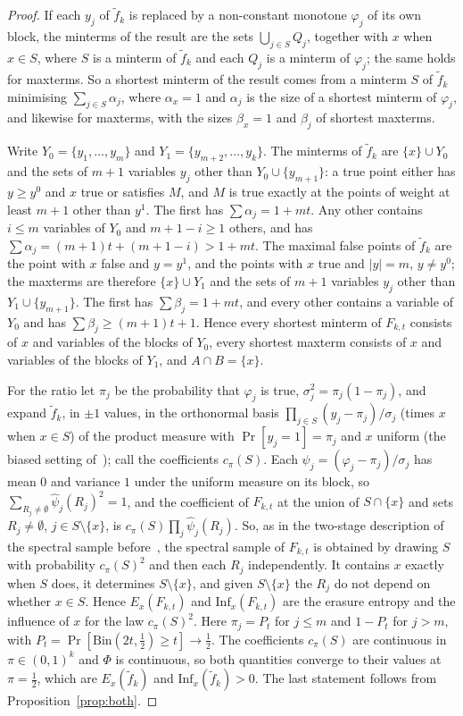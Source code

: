 \documentclass[11pt]{amsart}
\theoremstyle{remark}
\newcommand{\Inf}{\mathrm{Inf}}
\begin{document}
\begin{proof}
If each $y_j$ of $\tilde f_k$ is replaced by a non-constant monotone $\varphi_j$ of its own block, the minterms of
the result are the sets $\bigcup_{j\in S}Q_j$, together with $x$ when $x\in S$, where $S$ is a minterm of $\tilde f_k$ and each $Q_j$ is a minterm of $\varphi_j$; the same holds for maxterms. So a shortest minterm of the result comes from a
minterm $S$ of $\tilde f_k$ minimising $\sum_{j\in S}\alpha_j$, where $\alpha_x=1$ and $\alpha_j$ is the size of a shortest minterm of $\varphi_j$, and likewise for maxterms, with the sizes $\beta_x=1$ and $\beta_j$ of shortest maxterms.

Write $Y_0=\{y_1,\dots,y_m\}$ and $Y_1=\{y_{m+2},\dots,y_k\}$. The minterms of $\tilde f_k$ are $\{x\}\cup Y_0$ and the
sets of $m+1$ variables $y_j$ other than $Y_0\cup\{y_{m+1}\}$: a true point either has $y\ge y^0$ and $x$ true or
satisfies $M$, and $M$ is true exactly at the points of weight at least $m+1$ other than $y^1$. The first has
$\sum\alpha_j=1+mt$. Any other contains $i\le m$ variables of $Y_0$ and $m+1-i\ge1$ others, and has
$\sum\alpha_j=(m+1)t+(m+1-i)>1+mt$. The maximal false points of $\tilde f_k$ are the point with $x$ false and $y=y^1$, and
the points with $x$ true and $|y|=m$, $y\ne y^0$; the maxterms are therefore $\{x\}\cup Y_1$ and the sets of $m+1$
variables $y_j$ other than $Y_1\cup\{y_{m+1}\}$. The first has $\sum\beta_j=1+mt$, and every other contains a variable of
$Y_0$ and has $\sum\beta_j\ge(m+1)t+1$. Hence every shortest minterm of $F_{k,t}$ consists of $x$ and variables of the
blocks of $Y_0$, every shortest maxterm consists of $x$ and variables of the blocks of $Y_1$, and $A\cap B=\{x\}$.

For the ratio let $\pi_j$ be the probability that $\varphi_j$ is true, $\sigma_j^2=\pi_j(1-\pi_j)$, and expand
$\tilde f_k$, in $\pm1$ values, in the orthonormal basis $\prod_{j\in S}(y_j-\pi_j)/\sigma_j$ (times $x$ when $x\in
S$) of the product measure with $\Pr[y_j=1]=\pi_j$ and $x$ uniform (the biased setting of~\cite{KMS12}); call the
coefficients $c_\pi(S)$. Each
$\psi_j=(\varphi_j-\pi_j)/\sigma_j$ has mean $0$ and variance $1$ under the uniform measure on its block, so
$\sum_{R_j\ne\emptyset}\hat\psi_j(R_j)^2=1$, and the coefficient of $F_{k,t}$ at the union of $S\cap\{x\}$ and sets
$R_j\ne\emptyset$, $j\in S\setminus\{x\}$, is $c_\pi(S)\prod_j\hat\psi_j(R_j)$. So, as in the two-stage description
of the spectral sample before~\cite[Theorem~2.1]{Shm3}, the spectral sample of $F_{k,t}$ is obtained by drawing $S$ with probability $c_\pi(S)^2$ and then each $R_j$ independently. It contains $x$
exactly when $S$ does, it determines $S\setminus\{x\}$, and given $S\setminus\{x\}$ the $R_j$ do not depend on whether
$x\in S$. Hence $E_x(F_{k,t})$ and $\Inf_x(F_{k,t})$ are the erasure entropy and the influence of $x$ for the law
$c_\pi(S)^2$. Here $\pi_j=P_t$ for $j\le m$ and $1-P_t$ for $j>m$, with $P_t=\Pr[\mathrm{Bin}(2t,\frac12)\ge t]\to\frac12$.
The coefficients $c_\pi(S)$ are continuous in $\pi\in(0,1)^k$ and $\Phi$ is continuous, so both quantities converge
to their values at $\pi=\frac12$, which are $E_x(\tilde f_k)$ and $\Inf_x(\tilde f_k)>0$. The last statement follows
from Proposition~\ref{prop:both}.
\end{proof}
\end{document}
